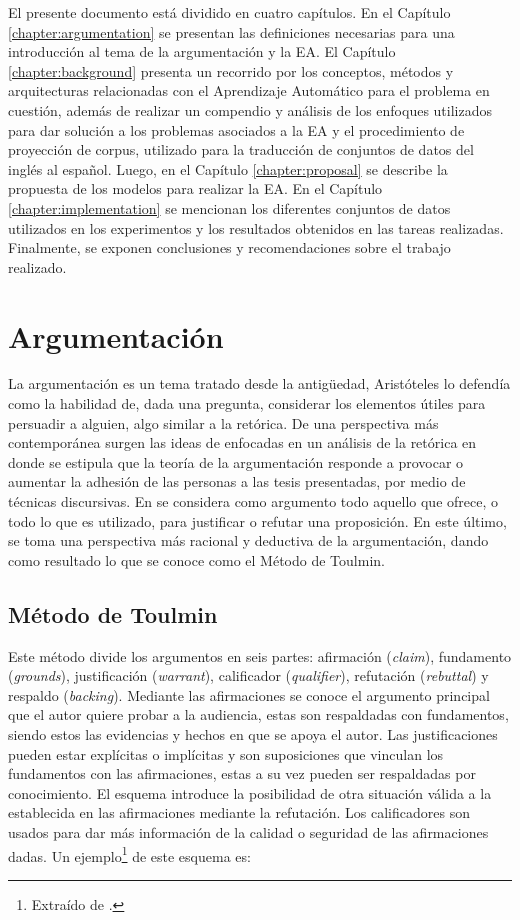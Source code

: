 \documentclass[a4paper,11pt,twocolumn,twoside]{article}
\begin{document}
El presente documento está dividido en cuatro capítulos.
En el Capítulo \ref{chapter:argumentation} se presentan las definiciones necesarias para una introducción
al tema de la argumentación y la EA.
El Capítulo \ref{chapter:background} presenta un recorrido por los 
conceptos, métodos y arquitecturas relacionadas con el Aprendizaje Automático para el problema 
en cuestión, además de realizar un compendio y análisis de los enfoques utilizados para dar solución
a los problemas asociados a la EA y el procedimiento de proyección de corpus, utilizado para la 
traducción de conjuntos de datos del inglés al español. 
Luego, en el Capítulo \ref{chapter:proposal}
se describe la propuesta de los modelos para realizar la EA.
En el Capítulo \ref{chapter:implementation} se mencionan los diferentes conjuntos de datos utilizados 
en los experimentos y los resultados obtenidos en las tareas realizadas.
Finalmente, se exponen conclusiones y recomendaciones sobre el trabajo 
realizado.

\section{Argumentación}

La argumentación es un tema tratado desde la antigüedad, Aristóteles lo defendía como la 
habilidad de, dada una pregunta, considerar los elementos útiles para persuadir a alguien, algo
similar a la retórica. De una perspectiva más contemporánea surgen las ideas de 
\cite{perelman1969rhetoric}
enfocadas en un análisis de la retórica en donde se estipula que la teoría de la argumentación
responde a provocar o aumentar la adhesión de las personas a las tesis presentadas, por medio de 
técnicas discursivas. En 
\cite{toulmin_2003}
se considera como argumento todo aquello que ofrece, 
o todo lo que es utilizado, para justificar o refutar una proposición. En este último, se toma 
una perspectiva más racional y deductiva de la argumentación, dando como resultado lo que se 
conoce como el Método de Toulmin. 

\subsection{Método de Toulmin}

Este método divide los argumentos en seis partes: afirmación 
(\textit{claim}), fundamento (\textit{grounds}), justificación (\textit{warrant}), calificador 
(\textit{qualifier}), refutación (\textit{rebuttal}) y respaldo (\textit{backing}).
Mediante las afirmaciones se conoce el argumento principal que el autor quiere probar a la audiencia,
estas son respaldadas con fundamentos, siendo estos las evidencias y hechos en que se apoya el autor.
Las justificaciones pueden estar explícitas o implícitas y son suposiciones que vinculan los
fundamentos con las afirmaciones, estas a su vez pueden ser respaldadas por conocimiento.
El esquema introduce la posibilidad de otra situación válida a la establecida en las afirmaciones
mediante la refutación. Los calificadores son usados para dar más información de la calidad o seguridad
de las afirmaciones dadas. Un ejemplo\footnote{Extraído de
	\cite{toulminArgument}.
} de este esquema es:
\end{document}
